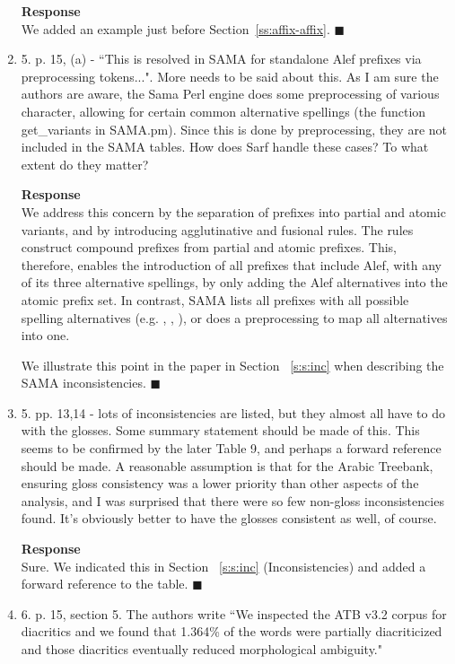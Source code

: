 \begin{enumerate}[leftmargin=0mm,label=\bfseries CommentR3.\arabic*]
\textbf{Response}\\
We added an example just before Section~\ref{ss:affix-affix}.
$\blacksquare$

\item \label{Review.3.11}
5. p. 15, (a) - ``This is resolved in SAMA for standalone Alef prefixes via preprocessing tokens...".   More needs to be said about this. As I am sure the authors are aware, the Sama Perl engine does some preprocessing of various character, allowing for certain common  alternative spellings (the function get\_variants in SAMA.pm). Since this is done by preprocessing, they are not included in  the SAMA tables.  How does Sarf handle these cases?  To what extent do they matter?

\textbf{Response}\\
We address this concern by the separation of prefixes into partial and atomic variants, and by 
introducing agglutinative and fusional rules. 
The rules construct compound prefixes from partial and atomic prefixes. 
This, therefore, enables the introduction of all prefixes that include Alef, with any of its three alternative spellings, 
by only adding the Alef alternatives into the atomic prefix set. In contrast, SAMA lists all prefixes with all 
possible spelling alternatives (e.g. , , ), or does a preprocessing to map all alternatives into one.

We illustrate this point in the paper in Section ~\ref{s:s:inc} when describing the SAMA inconsistencies. 
$\blacksquare$
\item \label{Review.3.12}
5. pp. 13,14 - lots of inconsistencies are listed, but they almost all have to do with the glosses.  Some summary statement should be made of this. This seems to be confirmed by the later Table 9, and perhaps a forward reference should be made.  A reasonable assumption is that  for the Arabic Treebank, ensuring gloss consistency was a lower priority than other aspects of the analysis, and I was surprised that there were so few non-gloss inconsistencies found.  It's obviously better to have the glosses consistent as well, of course.

\textbf{Response}\\
Sure. We indicated this in Section ~\ref{s:s:inc} (Inconsistencies) and added a forward reference to the table.
$\blacksquare$

\item \label{Review.3.13}
6. p. 15, section 5.  The authors write ``We inspected the ATB v3.2 corpus for diacritics and we found that 1.364\% of the words were partially diacriticized and those diacritics eventually reduced morphological ambiguity."


\end{enumerate}

